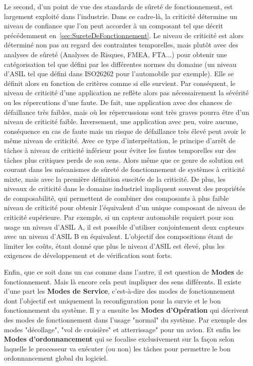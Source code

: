 \documentclass[french, a4paper, 11pt, twoside, pdftex]{StyleThese}
\begin{document}
    Le second, d'un point de vue des standards de sûreté de fonctionnement, est largement exploité dans l'industrie. Dans ce cadre-là, la criticité détermine un niveau de confiance que l'on peut accorder à un composant tel que décrit précédemment en~\autoref{sec:SureteDeFonctionnement}. Le niveau de criticité est alors déterminé non pas au regard des contraintes temporelles, mais plutôt avec des analyses de sûreté (Analyses de Risques, FMEA, FTA...) pour obtenir une catégorisation tel que défini par les différentes normes du domaine (un niveau d'ASIL tel que défini dans ISO26262 pour l'automobile par exemple). Elle se définit alors en fonction de critères comme si elle survient. Par conséquent, le niveau de criticité d'une application ne reflète alors pas nécessairement la sévérité ou les répercutions d'une faute. De fait, une application avec des chances de défaillance très faibles, mais où les répercussions sont très graves pourra être d'un niveau de criticité faible. Inversement, une application avec peu, voire aucune, conséquence en cas de faute mais un risque de défaillance très élevé peut avoir le même niveau de criticité. Avec ce type d'interprétation, le principe d'arrêt de tâches à niveau de criticité inférieur pour éviter les fautes temporelles sur des tâches plus critiques perds de son sens. Alors même que ce genre de solution est courant dans les mécanismes de sûreté de fonctionnement de systèmes à criticité mixte, mais avec la première définition suscitée de la criticité. De plus, les niveaux de criticité dans le domaine industriel impliquent souvent des propriétés de composabilité, qui permettent de combiner des composants à plus faible niveau de criticité pour obtenir l'équivalent d'un unique composant de niveau de criticité supérieure. Par exemple, si un capteur automobile requiert pour son usage un niveau d'ASIL A, il est possible d'utiliser conjointement deux capteurs avec un niveau d'ASIL B en équivalent. L'objectif des compositions étant de limiter les coûts, étant donné que plus le niveau d'ASIL est élevé, plus les exigences de développement et de vérification sont forts.
    
    Enfin, que ce soit dans un cas comme dans l'autre, il est question de \textbf{Modes} de fonctionnement. Mais là encore cela peut impliquer des sens différents. Il existe d'une part les \textbf{Modes de Service}, c'est-à-dire des modes de fonctionnement dont l'objectif est uniquement la reconfiguration pour la survie et le bon fonctionnement du système. Il y a ensuite les \textbf{Modes d'Opération} qui décrivent des modes de fonctionnement dans l'usage "normal" du système. Par exemple des modes "décollage", "vol de croisière" et atterrissage" pour un avion. Et enfin les \textbf{Modes d'ordonnancement} qui se focalise exclusivement sur la façon selon laquelle le processeur va exécuter (ou non) les tâches pour permettre le bon ordonnancement global du logiciel.
    
\end{document}
